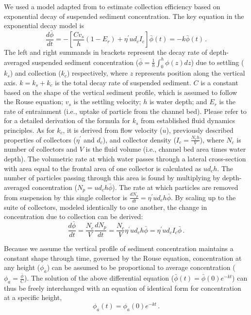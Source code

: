 \documentclass{scrreprt}
\begin{document}
We used a model adapted from \cite{Fauria_2015} to estimate collection efficiency based on exponential decay of suspended sediment concentration. The key equation in the exponential decay model is
\begin{equation}
    \frac{d\bar{\phi}}{dt} = -[\frac{Cv_s}{h}(1-E_r) + \eta^{\prime}ud_cI_c]\bar{\phi}(t) = -k\bar{\phi}(t)\,.
    \label{eq:model}    
\end{equation}
The left and right summands in brackets represent the decay rate of depth-averaged suspended sediment concentration ($\bar{\phi} = \frac{1}{h} \int_0^h\phi(z)dz$) due to settling ($k_s$) and collection ($k_c$) respectively, where $z$ represents position along the vertical axis. $k = k_s + k_c$ is the total decay rate of suspended sediment.  $C$ is a constant based on the shape of the vertical sediment profile, which is assumed to follow the Rouse equation; $v_s$ is the settling velocity; $h$ is water depth; and $E_r$ is the rate of entrainment (i.e., uptake of particle from the channel bed). Please refer to \cite{Fauria_2015} for a detailed derivation of the formula for $k_s$ from established fluid dynamics principles. As for $k_c$, it is derived from flow velocity ($u$), previously described properties of collectors ($\eta^\prime$ and $d_c$), and collector density ($I_c = \frac{N_ch}{V}$), where $N_c$ is number of collectors and $V$ is the fluid volume (i.e., channel bed area times water depth). The volumetric rate at which water passes through a lateral cross-section with area equal to the frontal area of one collector is calculated as $ud_ch$. The number of particles passing through this area is found by multiplying by depth-averaged concentration ($N_p = ud_ch\bar{\phi}$). The rate at which particles are removed from suspension by this single collector is $\frac{dN_p}{dt}=\eta^{\prime}ud_ch\bar{\phi}$. By scaling up to the suite of collectors, modeled identically to one another, the change in concentration due to collection can be derived:
\begin{equation}
\frac{d\bar{\phi}}{dt} = \frac{N_c}{V}\frac{dN_p}{dt} = \frac{N_c}{V}\eta^{\prime}ud_ch\bar{\phi} = \eta^{\prime}ud_cI_c\bar{\phi}\,.
\label{eq:collection}
\end{equation}

Because we assume the vertical profile of sediment concentration maintains a constant shape through time, governed by the Rouse equation, concentration at any height ($\phi_a$) can be assumed to be proportional to average concentration ($\phi_a=\frac{\bar{\phi}}{C}$). The solution of the above differential equation ($\bar{\phi}(t) = \bar{\phi}(0)e^{-kt}$) can thus be freely interchanged with an equation of identical form for concentration at a specific height,
\begin{equation}
    \phi_a(t) = \phi_a(0)e^{-kt}\,.
    \label{eq:specconc}
\end{equation}
\end{document}
